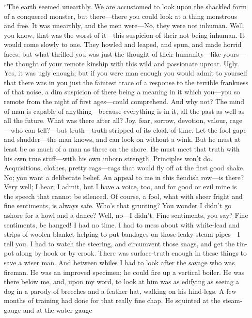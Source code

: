 \documentclass[12pt]{report}
\begin{document}
``The earth seemed unearthly. We are accustomed to look upon the
shackled form of a conquered monster, but there---there you could look
at a thing monstrous and free. It was unearthly, and the men were---No,
they were not inhuman. Well, you know, that was the worst of it---this
suspicion of their not being inhuman. It would come slowly to one. They
howled and leaped, and spun, and made horrid faces; but what thrilled
you was just the thought of their humanity---like yours---the thought of
your remote kinship with this wild and passionate uproar. Ugly. Yes, it
was ugly enough; but if you were man enough you would admit to yourself
that there was in you just the faintest trace of a response to the
terrible frankness of that noise, a dim suspicion of there being a
meaning in it which you---you so remote from the night of first
ages---could comprehend. And why not? The mind of man is capable of
anything---because everything is in it, all the past as well as all the
future. What was there after all? Joy, fear, sorrow, devotion, valour,
rage---who can tell?---but truth---truth stripped of its cloak of time.
Let the fool gape and shudder---the man knows, and can look on without a
wink. But he must at least be as much of a man as these on the shore. He
must meet that truth with his own true stuff---with his own inborn
strength. Principles won't do. Acquisitions, clothes, pretty rags---rags
that would fly off at the first good shake. No; you want a deliberate
belief. An appeal to me in this fiendish row---is there? Very well; I
hear; I admit, but I have a voice, too, and for good or evil mine is the
speech that cannot be silenced. Of course, a fool, what with sheer
fright and fine sentiments, is always safe. Who's that grunting? You
wonder I didn't go ashore for a howl and a dance? Well, no---I didn't.
Fine sentiments, you say? Fine sentiments, be hanged! I had no time. I
had to mess about with white-lead and strips of woolen blanket helping
to put bandages on those leaky steam-pipes---I tell you. I had to watch
the steering, and circumvent those snags, and get the tin-pot along by
hook or by crook. There was surface-truth enough in these things to save
a wiser man. And between whiles I had to look after the savage who was
fireman. He was an improved specimen; he could fire up a vertical
boiler. He was there below me, and, upon my word, to look at him was as
edifying as seeing a dog in a parody of breeches and a feather hat,
walking on his hind-legs. A few months of training had done for that
really fine chap. He squinted at the steam-gauge and at the water-gauge
\end{document}
